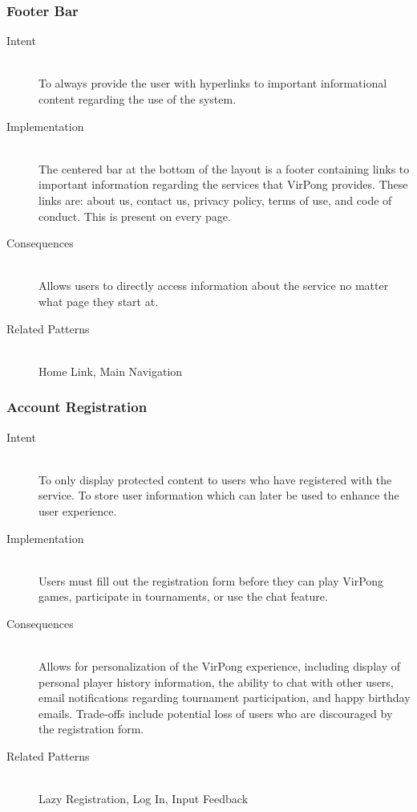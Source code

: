 		\subsubsection{Footer Bar}
			\begin{description}
				\item[Intent] \hfill \\
					To always provide the user with hyperlinks to important informational content regarding the use of the system.
				\item[Implementation] \hfill \\
					The centered bar at the bottom of the layout is a footer containing links to important information regarding the services that VirPong provides. These links are: about us, contact us, privacy policy, terms of use, and code of conduct. This is present on every page.
				\item[Consequences] \hfill \\
					Allows users to directly access information about the service no matter what page they start at.
				\item[Related Patterns] \hfill \\
					Home Link, Main Navigation
			\end{description}
			
		\subsubsection{Account Registration}
			\begin{description}
				\item[Intent] \hfill \\
					To only display protected content to users who have registered with the service. To store user information which can later be used to enhance the user experience.
				\item[Implementation] \hfill \\
					Users must fill out the registration form before they can play VirPong games, participate in tournaments, or use the chat feature.
				\item[Consequences] \hfill \\
					Allows for personalization of the VirPong experience, including display of personal player history information, the ability to chat with other users, email notifications regarding tournament participation, and happy birthday emails. Trade-offs include potential loss of users who are discouraged by the registration form.
				\item[Related Patterns] \hfill \\
					Lazy Registration, Log In, Input Feedback
			\end{description}
			
